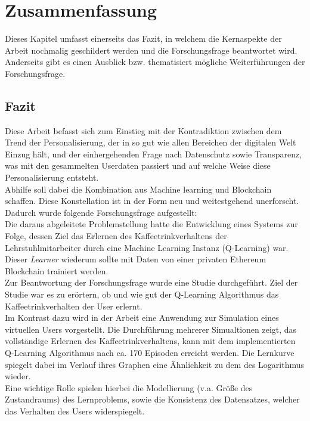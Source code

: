 \chapter{Zusammenfassung}
\label{kap:Kapitel05}
Dieses Kapitel umfasst einerseits das Fazit, in welchem die Kernaspekte der Arbeit nochmalig geschildert werden und die Forschungsfrage beantwortet wird. Anderseits gibt es einen Ausblick bzw. thematisiert mögliche Weiterführungen der Forschungsfrage. 

\section{Fazit}
\label{sec:fazit}
Diese Arbeit befasst sich zum Einstieg mit der Kontradiktion zwischen dem Trend der Personalisierung, der in so gut wie allen Bereichen der digitalen Welt Einzug hält, und der einhergehenden Frage nach Datenschutz sowie Transparenz, was mit den gesammelten Userdaten passiert und auf welche Weise diese Personalisierung entsteht.\\
Abhilfe soll dabei die Kombination aus Machine learning und Blockchain schaffen. Diese Konstellation ist in der Form neu und weitestgehend unerforscht. Dadurch wurde folgende Forschungsfrage aufgestellt: \\ 
Die daraus abgeleitete Problemstellung hatte die Entwicklung eines Systems zur Folge, dessen Ziel das Erlernen des Kaffeetrinkverhaltens der Lehrstuhlmitarbeiter durch eine Machine Learning Instanz (Q-Learning) war. Dieser \textit{Learner} wiederum sollte mit Daten von einer privaten Ethereum Blockchain trainiert werden. \\
Zur Beantwortung der Forschungsfrage wurde eine Studie durchgeführt.
Ziel der Studie war es zu erörtern, ob und wie gut der Q-Learning Algorithmus das Kaffeetrinkverhalten der User erlernt. \\
Im Kontrast dazu wird in der Arbeit eine Anwendung zur Simulation eines virtuellen Users vorgestellt. Die Durchführung mehrerer Simualtionen zeigt, das vollständige Erlernen des Kaffeetrinkverhaltens, kann mit dem implementierten Q-Learning Algorithmus nach ca. 170 Episoden erreicht werden. 
Die Lernkurve spiegelt dabei im Verlauf ihres Graphen eine Ähnlichkeit zu dem des Logarithmus wieder. \\
Eine wichtige Rolle spielen hierbei die Modellierung (v.a. Größe des Zustandraums) des Lernproblems, sowie die Konsistenz des Datensatzes, welcher das Verhalten des Users widerspiegelt. \\
